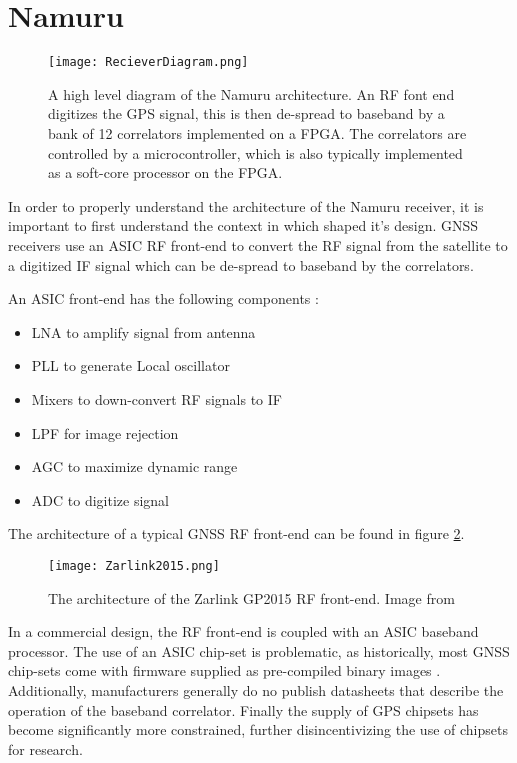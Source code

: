 \section{Namuru}
 

\begin{figure}[!htb] 
    \centering
    \texttt{[image: RecieverDiagram.png]} 
    \caption{A high level diagram of the Namuru architecture. An RF font end digitizes the GPS signal, this is then de-spread to baseband by a bank of 12 correlators implemented on a FPGA. The correlators are controlled by a microcontroller, which is also typically implemented as a soft-core processor on the FPGA.}
    \label{fig:RecieverDiagram}
\end{figure}

In order to properly understand the architecture of the Namuru receiver, it is important to first understand the context in which shaped it's design. \ac{GNSS} receivers use an \ac{ASIC} RF front-end to convert the \ac{RF} signal from the satellite to a digitized \ac{IF} signal which can be de-spread to baseband by the correlators. 

An \ac{ASIC} front-end has the following components \cite{GlennonPresentation}: 

\begin{itemize}
\item{\ac{LNA} to amplify signal from antenna}
\item{\ac{PLL} to generate Local oscillator}
\item{Mixers to down-convert RF signals to IF}
\item{\ac{LPF} for image rejection}
\item{\ac{AGC} to maximize dynamic range}
\item{\ac{ADC} to digitize signal}
\end{itemize}

The architecture of a typical \ac{GNSS} \ac{RF} front-end can be found in figure \ref{fig:Zarlink2015}.  

\begin{figure}[!htb] 
    \centering
    \texttt{[image: Zarlink2015.png]} 
    \caption{The architecture of the Zarlink GP2015 \ac{RF} front-end. Image from \cite{Zarlink2015}}
    \label{fig:Zarlink2015}
\end{figure}

In a commercial design, the RF front-end is coupled with an ASIC baseband processor. The use of an ASIC chip-set is problematic, as historically, most \ac{GNSS} chip-sets come with firmware supplied as pre-compiled binary images \cite{Glennon11aquariusfirmware}. 
Additionally, manufacturers generally do no publish datasheets that describe the operation of the baseband correlator\cite{Glennon11aquariusfirmware}. Finally the supply of GPS chipsets has become significantly more constrained, further disincentivizing the use of chipsets for research.

